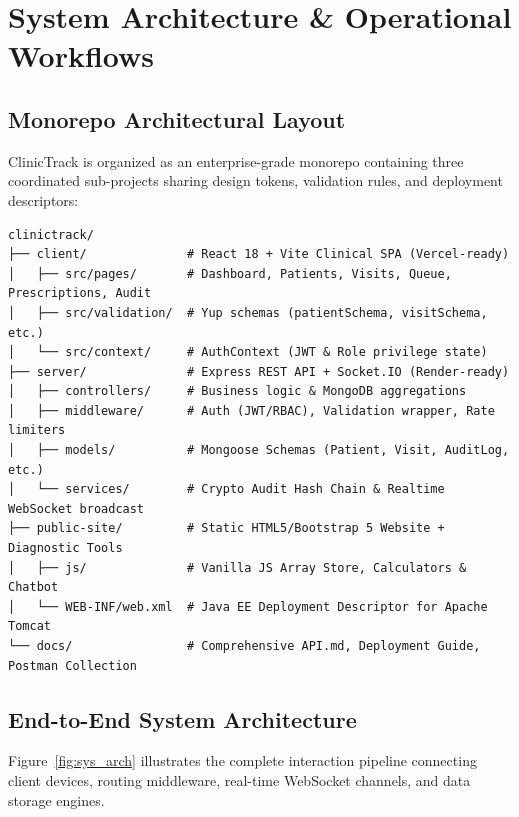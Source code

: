 \documentclass[12pt,a4paper,oneside]{report}
\begin{document}
\chapter{System Architecture \& Operational Workflows}

\section{Monorepo Architectural Layout}
ClinicTrack is organized as an enterprise-grade monorepo containing three coordinated sub-projects sharing design tokens, validation rules, and deployment descriptors:

\begin{verbatim}
clinictrack/
├── client/              # React 18 + Vite Clinical SPA (Vercel-ready)
│   ├── src/pages/       # Dashboard, Patients, Visits, Queue, Prescriptions, Audit
│   ├── src/validation/  # Yup schemas (patientSchema, visitSchema, etc.)
│   └── src/context/     # AuthContext (JWT & Role privilege state)
├── server/              # Express REST API + Socket.IO (Render-ready)
│   ├── controllers/     # Business logic & MongoDB aggregations
│   ├── middleware/      # Auth (JWT/RBAC), Validation wrapper, Rate limiters
│   ├── models/          # Mongoose Schemas (Patient, Visit, AuditLog, etc.)
│   └── services/        # Crypto Audit Hash Chain & Realtime WebSocket broadcast
├── public-site/         # Static HTML5/Bootstrap 5 Website + Diagnostic Tools
│   ├── js/              # Vanilla JS Array Store, Calculators & Chatbot
│   └── WEB-INF/web.xml  # Java EE Deployment Descriptor for Apache Tomcat
└── docs/                # Comprehensive API.md, Deployment Guide, Postman Collection
\end{verbatim}

\section{End-to-End System Architecture}
Figure~\ref{fig:sys_arch} illustrates the complete interaction pipeline connecting client devices, routing middleware, real-time WebSocket channels, and data storage engines.
\end{document}
